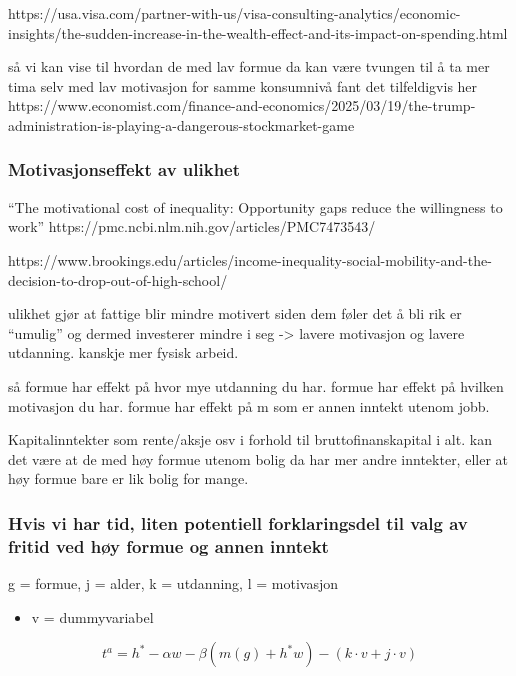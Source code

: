 \documentclass[
  12pt,
  a4paper,
  DIV=11,
  numbers=noendperiod]{scrartcl}
\providecommand{\tightlist}{%
  \setlength{\itemsep}{0pt}\setlength{\parskip}{0pt}}\usepackage{longtable,booktabs,array}
\begin{document}
https://usa.visa.com/partner-with-us/visa-consulting-analytics/economic-insights/the-sudden-increase-in-the-wealth-effect-and-its-impact-on-spending.html

så vi kan vise til hvordan de med lav formue da kan være tvungen til å
ta mer tima selv med lav motivasjon for samme konsumnivå fant det
tilfeldigvis her
https://www.economist.com/finance-and-economics/2025/03/19/the-trump-administration-is-playing-a-dangerous-stockmarket-game

\subsubsection{Motivasjonseffekt av
ulikhet}\label{motivasjonseffekt-av-ulikhet}

``The motivational cost of inequality: Opportunity gaps reduce the
willingness to work'' https://pmc.ncbi.nlm.nih.gov/articles/PMC7473543/

https://www.brookings.edu/articles/income-inequality-social-mobility-and-the-decision-to-drop-out-of-high-school/

ulikhet gjør at fattige blir mindre motivert siden dem føler det å bli
rik er ``umulig'' og dermed investerer mindre i seg -\textgreater{}
lavere motivasjon og lavere utdanning. kanskje mer fysisk arbeid.

så formue har effekt på hvor mye utdanning du har. formue har effekt på
hvilken motivasjon du har. formue har effekt på m som er annen inntekt
utenom jobb.

Kapitalinntekter som rente/aksje osv i forhold til bruttofinanskapital i
alt. kan det være at de med høy formue utenom bolig da har mer andre
inntekter, eller at høy formue bare er lik bolig for mange.

\subsubsection{Hvis vi har tid, liten potentiell forklaringsdel til valg
av fritid ved høy formue og annen
inntekt}\label{hvis-vi-har-tid-liten-potentiell-forklaringsdel-til-valg-av-fritid-ved-huxf8y-formue-og-annen-inntekt}

g = formue, j = alder, k = utdanning, l = motivasjon

\begin{itemize}
\tightlist
\item
  v = dummyvariabel
\end{itemize}

\[
t^a = h^* - \alpha w - \beta(m(g) + h^*w) - (k\cdot v+j\cdot v)
\]
\end{document}

